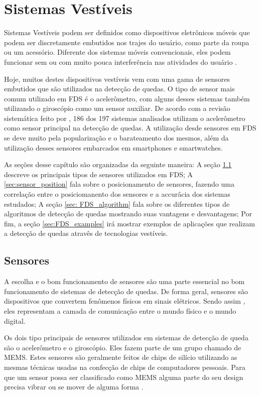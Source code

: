 \chapter{Sistemas Vestíveis} 
\label{cap:wearable_systems}

Sistemas Vestíveis podem ser definidos como dispositivos eletrônicos móveis que podem ser discretamente embutidos nos trajes do usuário, como parte da roupa ou um acessório. Diferente dos sistemas móveis convencionais, eles podem funcionar sem ou com muito pouca interferência nas atividades do usuário \citep{lukowicz2004wearable}. 

Hoje, muitos destes dispositivos vestíveis vem com uma gama de sensores embutidos que são utilizados na detecção de quedas. O tipo de sensor mais comum utilizado em \ac{FDS} é o acelerômetro, com alguns desses sistemas também utilizando o giroscópio como um sensor auxiliar. De acordo com a revisão sistemática feito por \cite{igual2013challenges}, 186 dos 197 sistemas analisados utilizam o acelerômetro como sensor principal na detecção de quedas. A utilização desde sensores em \ac{FDS} se deve muito pela popularização e o barateamento dos mesmos, além da utilização desses sensores embarcados em smartphones e smartwatches.


As seções desse capítulo são organizadas da seguinte maneira: A seção \ref{sec:sensors} descreve os principais tipos de sensores utilizados em \ac{FDS}; A \ref{sec:sensor_position} fala sobre o posicionamento de sensores, fazendo uma correlação entre o posiciomanento dos sensores e a accurâcia dos sistemas estudados; A seção \ref{sec: FDS_algorithm} fala sobre os diferentes tipos de algoritmos de detecção de quedas mostrando suas vantagens e desvantagens; Por fim, a seção \ref{sec:FDS_examples} irá mostrar exemplos de aplicações que realizam a detecção de quedas atravês de tecnologias vestíveis. 



\section{Sensores}
\label{sec:sensors}
A escolha e o bom funcionamento de sensores são uma parte essencial no bom funcionamento de sistemas de detecção de quedas. De forma geral, sensores são dispositivos que convertem fenômenos físicos em sinais elétricos. Sendo assim , eles representam a camada de comunicação entre o mundo físico e o mundo digital. 

Os dois tipo principais de sensores utilizados em sistemas de detecção de queda são o acelerômetro e o giroscópio. Eles fazem parte de um grupo chamado de \ac{MEMS}. Estes sensores são geralmente feitos de chips de silício utilizando as mesmas técnicas usadas na confecção de chips de computadores pessoais. Para que um sensor possa ser classificado como \ac{MEMS} alguma parte do seu design precisa vibrar ou se mover de alguma forma \citep{milette2012professional}. 

